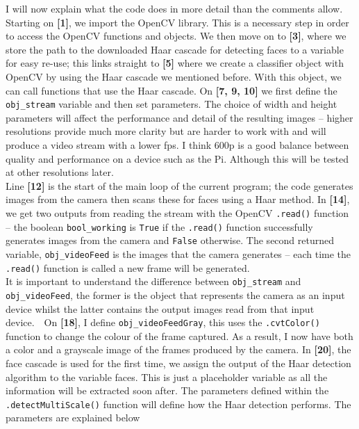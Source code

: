 \documentclass[9pt]{article}
\begin{document}
I will now explain what the code does in more detail than the comments allow. Starting on \textbf{[1]}, we import the OpenCV library. This is a necessary step in order to access the OpenCV functions and objects. We then move on to \textbf{[3]}, where we store the path to the downloaded Haar cascade for detecting faces to a variable for easy re-use; this links straight to \textbf{[5]} where we create a classifier object with OpenCV by using the Haar cascade we mentioned before. With this object, we can call functions that use the Haar cascade. On \textbf{[7, 9, 10]} we first define the \texttt{obj\_stream} variable and then set parameters. The choice of width and height parameters will affect the performance and detail of the resulting images -- higher resolutions provide much more clarity but are harder to work with and will produce a video stream with a lower fps. I think 600p is a good balance between quality and performance on a device such as the Pi. Although this will be tested at other resolutions later. \\
Line \textbf{[12]} is the start of the main loop of the current program; the code generates images from the camera then scans these for faces using a Haar method. In \textbf{[14]}, we get two outputs from reading the stream with the OpenCV \texttt{.read()} function -- the boolean \texttt{bool\_working} is \texttt{True} if the \texttt{.read()} function successfully generates images from the camera and \texttt{False} otherwise. The second returned variable, \texttt{obj\_videoFeed} is the images that the camera generates -- each time the \texttt{.read()} function is called a new frame will be generated.\\
It is important to understand the difference between \texttt{obj\_stream} and \texttt{obj\_videoFeed}, the former is the object that represents the camera as an input device whilst the latter contains the output images read from that input device.\	\
On \textbf{[18]}, I define \texttt{obj\_videoFeedGray}, this uses the \texttt{.cvtColor()} function to change the colour of the frame captured. As a result, I now have both a color and a grayscale image of the frames produced by the camera. In \textbf{[20]}, the face cascade is used for the first time, we assign the output of the Haar detection algorithm to the variable faces. This is just a placeholder variable as all the information will be extracted soon after. The parameters defined within the \texttt{.detectMultiScale()} function will define how the Haar detection performs. The parameters are explained below
\end{document}
